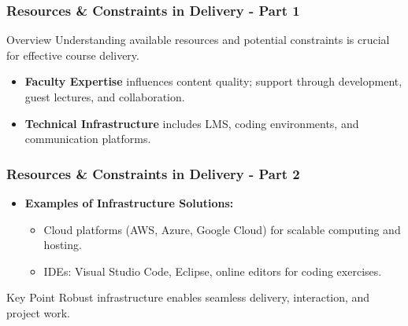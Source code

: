 \documentclass{beamer}
\begin{document}
\begin{frame}[fragile]
  \frametitle{Resources \& Constraints in Delivery - Part 1}
  \pause
  \begin{block}{Overview}
    Understanding available resources and potential constraints is crucial for effective course delivery.
  \end{block}
  \pause
  \begin{itemize}
    \item \textbf{Faculty Expertise} influences content quality; support through development, guest lectures, and collaboration.
    \item \textbf{Technical Infrastructure} includes LMS, coding environments, and communication platforms.
  \end{itemize}
\end{frame}

\begin{frame}[fragile]
  \frametitle{Resources \& Constraints in Delivery - Part 2}
  \pause
  \begin{itemize}
    \item \textbf{Examples of Infrastructure Solutions:}
    \begin{itemize}
      \item Cloud platforms (AWS, Azure, Google Cloud) for scalable computing and hosting.
      \item IDEs: Visual Studio Code, Eclipse, online editors for coding exercises.
    \end{itemize}
  \end{itemize}
  \pause
  \begin{block}{Key Point}
    Robust infrastructure enables seamless delivery, interaction, and project work.
  \end{block}
\end{frame}
\end{document}
